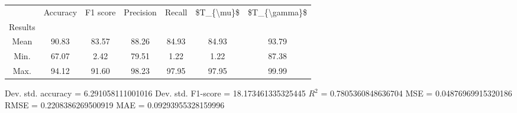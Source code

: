 \begin{tabular}{|c|c|c|c|c|c|c|}
\toprule
{} &  Accuracy &  F1 score &  Precision &  Recall &  \$T\_\{\textbackslash mu\}\$ &  \$T\_\{\textbackslash gamma\}\$ \\
Results &           &           &            &         &            &               \\
\hline
Mean    &     90.83 &     83.57 &      88.26 &   84.93 &      84.93 &         93.79 \\
Min.    &     67.07 &      2.42 &      79.51 &    1.22 &       1.22 &         87.38 \\
Max.    &     94.12 &     91.60 &      98.23 &   97.95 &      97.95 &         99.99 \\
\bottomrule
\end{tabular}

 Dev. std. accuracy = 6.291058111001016
 Dev. std. F1-score = 18.173461335325445
 $R^2$ = 0.7805360848636704
 MSE = 0.04876969915320186
 RMSE = 0.2208386269500919
 MAE = 0.09293955328159996